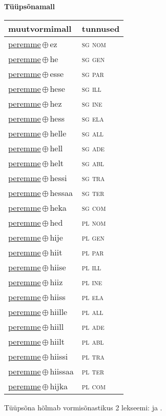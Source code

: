 

\vspace{3.5em}
\noindent \begin{minipage}{\textwidth}
\noindent \textbf{Tüüpsõnamall \,}\\

\begin{sideways}
\begin{tabular}{l l}
muutvormimall & tunnused \\
\hline
\underline{peremme}\,$\oplus$\,ez & \textsc{ sg nom } \\
\underline{peremme}\,$\oplus$\,he & \textsc{ sg gen } \\
\underline{peremme}\,$\oplus$\,esse & \textsc{ sg par } \\
\underline{peremme}\,$\oplus$\,hese & \textsc{ sg ill } \\
\underline{peremme}\,$\oplus$\,hez & \textsc{ sg ine } \\
\underline{peremme}\,$\oplus$\,hess & \textsc{ sg ela } \\
\underline{peremme}\,$\oplus$\,helle & \textsc{ sg all } \\
\underline{peremme}\,$\oplus$\,hell & \textsc{ sg ade } \\
\underline{peremme}\,$\oplus$\,helt & \textsc{ sg abl } \\
\underline{peremme}\,$\oplus$\,hessi & \textsc{ sg tra } \\
\underline{peremme}\,$\oplus$\,hessaa & \textsc{ sg ter } \\
\underline{peremme}\,$\oplus$\,heka & \textsc{ sg com } \\
\underline{peremme}\,$\oplus$\,hed & \textsc{ pl nom } \\
\underline{peremme}\,$\oplus$\,hije & \textsc{ pl gen } \\
\underline{peremme}\,$\oplus$\,hiit & \textsc{ pl par } \\
\underline{peremme}\,$\oplus$\,hiise & \textsc{ pl ill } \\
\underline{peremme}\,$\oplus$\,hiiz & \textsc{ pl ine } \\
\underline{peremme}\,$\oplus$\,hiiss & \textsc{ pl ela } \\
\underline{peremme}\,$\oplus$\,hiille & \textsc{ pl all } \\
\underline{peremme}\,$\oplus$\,hiill & \textsc{ pl ade } \\
\underline{peremme}\,$\oplus$\,hiilt & \textsc{ pl abl } \\
\underline{peremme}\,$\oplus$\,hiissi & \textsc{ pl tra } \\
\underline{peremme}\,$\oplus$\,hiissaa & \textsc{ pl ter } \\
\underline{peremme}\,$\oplus$\,hijka & \textsc{ pl com } \\
\end{tabular}
\end{sideways}
\label{tab:tüüpsõnamall-peremmeez}

\end{minipage}

 
\vspace{1em}
\noindent Tüüpsõna hõlmab vormisõnastikus 2 lekseemi:  ja .
